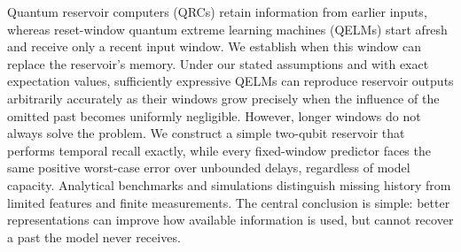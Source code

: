 Quantum reservoir computers (QRCs) retain information from earlier inputs,
whereas reset-window quantum extreme learning machines (QELMs) start afresh
and receive only a recent input window. We establish when this window can
replace the reservoir's memory. Under our stated assumptions and with exact
expectation values, sufficiently expressive QELMs can reproduce reservoir
outputs arbitrarily accurately as their windows grow precisely when the
influence of the omitted past becomes uniformly negligible. However, longer
windows do not always solve the problem. We construct a simple two-qubit
reservoir that performs temporal recall exactly, while every fixed-window
predictor faces the same positive worst-case error over unbounded delays,
regardless of model capacity. Analytical benchmarks and simulations
distinguish missing history from limited features and finite measurements.
The central conclusion is simple: better representations can improve how
available information is used, but cannot recover a past the model never
receives.
